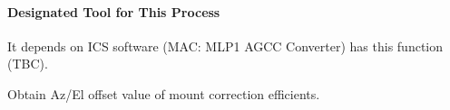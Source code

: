 


\paragraph{Designated Tool for This Process}
It depends on ICS software (MAC: MLP1 AGCC Converter) has this function (TBC).

\begin{itembox}[l]{}
Obtain Az/El offset value of mount correction efficients.

\end{itembox}
